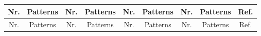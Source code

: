 \documentclass[12pt]{article}
\begin{document}
{
\setlength{\LTcapwidth}{\textwidth}
\captionsetup[table]{margin=0pt}
\renewcommand{\arraystretch}{1.85}   
\setlength{\tabcolsep}{5pt}          
\footnotesize
\begin{longtable}{|c c c c c c c c|c|}
\hline
\footnotesize{Nr.} & {\footnotesize Patterns} &
\footnotesize{Nr.} & {\footnotesize Patterns} &
\footnotesize{Nr.} & {\footnotesize Patterns} &
\footnotesize{Nr.} & {\footnotesize Patterns} &
{\footnotesize Ref.} \\
\hline
\hline
\endfirsthead

\hline
\footnotesize{Nr.} & {\footnotesize Patterns} &
\footnotesize{Nr.} & {\footnotesize Patterns} &
\footnotesize{Nr.} & {\footnotesize Patterns} &
\footnotesize{Nr.} & {\footnotesize Patterns} &
{\footnotesize Ref.} \\
\hline
\hline
\endhead


\end{longtable}}
\end{document}
